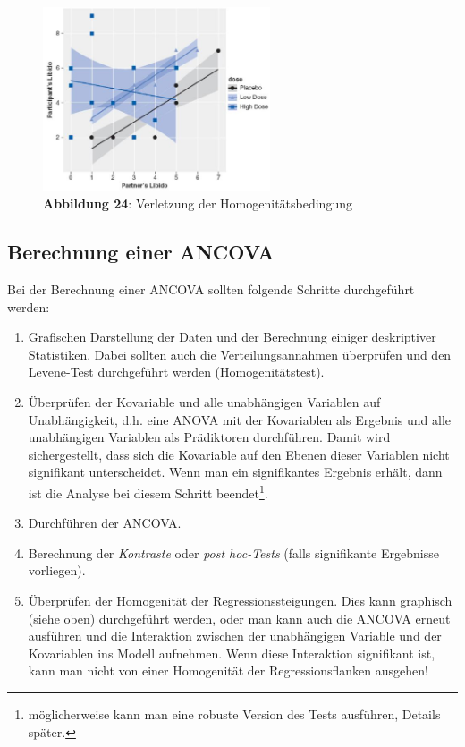 \documentclass[]{article}
\providecommand{\tightlist}{%
  \setlength{\itemsep}{0pt}\setlength{\parskip}{0pt}}
\let\rmarkdownfootnote\footnote%
\def\footnote{\protect\rmarkdownfootnote}
\begin{document}
\begin{figure}
\centering
\includegraphics[width=0.6\textwidth,height=\textheight]{Images/Kovarianz_Field_11_3.jpg}
\caption{\textbf{Abbildung 24}: Verletzung der Homogenitätsbedingung}
\end{figure}

\hypertarget{berechnung-einer-ancova}{%
\subsection*{Berechnung einer ANCOVA}\label{berechnung-einer-ancova}}

Bei der Berechnung einer ANCOVA sollten folgende Schritte durchgeführt werden:

\begin{enumerate}
\def\labelenumi{\arabic{enumi}.}
\tightlist
\item
  Grafischen Darstellung der Daten und der Berechnung einiger deskriptiver Statistiken. Dabei sollten auch die Verteilungsannahmen überprüfen und den Levene-Test durchgeführt werden (Homogenitätstest).
\item
  Überprüfen der Kovariable und alle unabhängigen Variablen auf Unabhängigkeit, d.h. eine ANOVA mit der Kovariablen als Ergebnis und alle unabhängigen Variablen als Prädiktoren durchführen. Damit wird sichergestellt, dass sich die Kovariable auf den Ebenen dieser Variablen nicht signifikant unterscheidet. Wenn man ein signifikantes Ergebnis erhält, dann ist die Analyse bei diesem Schritt beendet\footnote{möglicherweise kann man eine robuste Version des Tests ausführen, Details später.}.
\item
  Durchführen der ANCOVA.
\item
  Berechnung der \emph{Kontraste} oder \emph{post hoc-Tests} (falls signifikante Ergebnisse vorliegen).
\item
  Überprüfen der Homogenität der Regressionssteigungen. Dies kann graphisch (siehe oben) durchgeführt werden, oder man kann auch die ANCOVA erneut ausführen und die Interaktion zwischen der unabhängigen Variable und der Kovariablen ins Modell aufnehmen. Wenn diese Interaktion signifikant ist, kann man nicht von einer Homogenität der Regressionsflanken ausgehen!
\end{enumerate}
\end{document}
